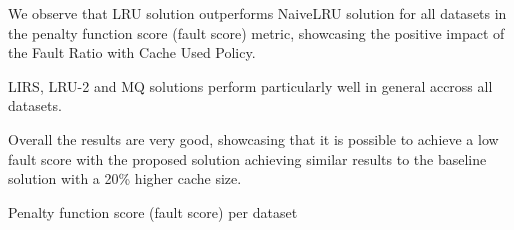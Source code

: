 We observe that LRU solution outperforms NaiveLRU solution for all datasets in the penalty 
function score (fault score) metric, showcasing the positive impact of the Fault Ratio with
Cache Used Policy.

LIRS, LRU-2 and MQ solutions perform particularly well in general accross all datasets.

Overall the results are very good, showcasing that it is possible to achieve a low fault score
with the proposed solution achieving similar results to the baseline solution with a 20\% higher
cache size.

\begin{table}[H]
  \centering
  \small
  \caption{Penalty function score (fault score) per dataset}
  \label{tab:fault-score-per-experiment-dataset}
\end{table}